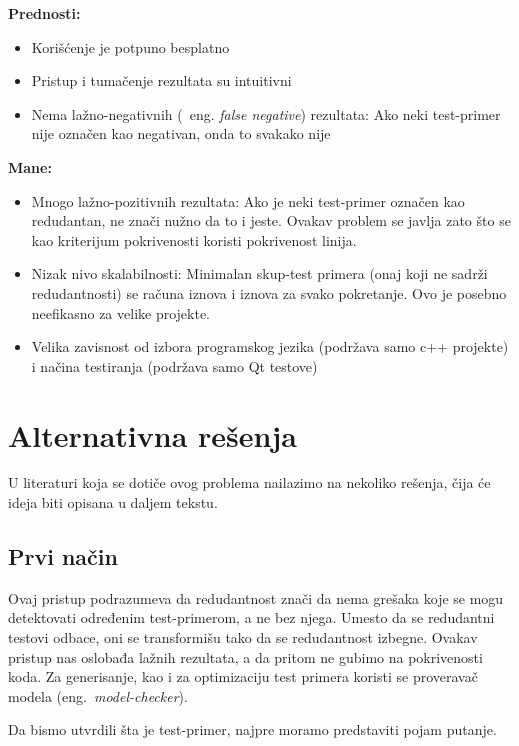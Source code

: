 \documentclass[a4paper]{article}
\theoremstyle{definition}
\begin{document}
\textbf{Prednosti:}
\begin{itemize}
    \item Korišćenje je potpuno besplatno
    \item Pristup i tumačenje rezultata su intuitivni
    \item Nema lažno-negativnih (~eng. \textit{false negative}) rezultata: Ako neki test-primer nije označen kao negativan, onda to svakako nije
\end{itemize}

\textbf{Mane:}
\begin{itemize}
    \item Mnogo lažno-pozitivnih rezultata: Ako je neki test-primer označen kao redudantan, ne znači nužno da to i jeste. Ovakav problem se javlja zato što se kao kriterijum pokrivenosti koristi pokrivenost linija.
    \item Nizak nivo skalabilnosti: Minimalan skup-test primera (onaj koji ne sadrži redudantnosti) se računa iznova i iznova za svako pokretanje. Ovo je posebno neefikasno za velike projekte.
    \item Velika zavisnost od izbora programskog jezika (podržava samo c++ projekte) i načina testiranja (podržava samo Qt testove) 
\end{itemize}


\section{Alternativna rešenja}
\label{sec:alternative}

U literaturi koja se dotiče ovog problema nailazimo na nekoliko rešenja, čija će ideja biti opisana u daljem tekstu.

\subsection{Prvi način}
\label{subsec:prvi}

Ovaj pristup\cite{prvinacin} podrazumeva da redudantnost znači da nema grešaka koje se mogu detektovati određenim test-primerom, a ne bez njega. Umesto da se redudantni testovi odbace, oni se transformišu tako da se redudantnost izbegne. Ovakav pristup nas oslobađa lažnih rezultata, a da pritom ne gubimo na pokrivenosti koda. Za generisanje, kao i za optimizaciju test primera koristi se proveravač modela (eng.~{\em model-checker}).

Da bismo utvrdili šta je test-primer, najpre moramo predstaviti pojam putanje.
\end{document}
